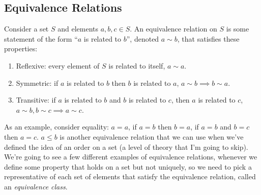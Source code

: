 \documentclass[../analysis.tex]{subfiles}
\begin{document}
\subsection{Equivalence Relations}
Consider a set $S$ and elements $a, b, c \in S$. An equivalence relation on $S$ is some statement of the form ``$a$ is related to $b$'', denoted $a \sim b$, that satisfies these properties:

\begin{enumerate}
    \item Reflexive: every element of $S$ is related to itself, $a \sim a$.
    \item Symmetric: if $a$ is related to $b$ then $b$ is related to $a$, $a \sim b \implies b \sim a$.
    \item Transitive: if $a$ is related to $b$ and $b$ is related to $c$, then $a$ is related to $c$, $a \sim b, b \sim c \implies a \sim c$.
\end{enumerate}

As an example, consider equality: $a = a$, if $a = b$ then $b = a$, if $a = b$ and $b = c$ then $a = c$. $a \leq b$ is another equivalence relation that we can use when we've defined the idea of an order on a set (a level of theory that I'm going to skip). We're going to see a few different examples of equivalence relations, whenever we define some property that holds on a set but not uniquely, so we need to pick a representative of each set of elements that satisfy the equivalence relation, called an \emph{equivalence class}.
\end{document}
